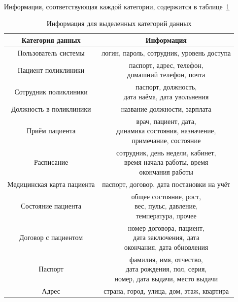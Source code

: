 Информация, соответствующая каждой категории, содержится в таблице~\ref{table:category-info}

\begin{table}[h!]
\begin{center}
	\captionsetup{justification=raggedright,singlelinecheck=off,margin=5mm}
	\caption{Информация для выделенных категорий данных}
	\begin{tabular}{| c | c |}
		\hline
		Категория данных & Информация \\
		\hline
		Пользователь системы & логин, пароль, сотрудник, уровень доступа \\
		\hline
		Пациент поликлиники & \makecell{паспорт, адрес, телефон,\\ домашний телефон, почта}  \\
		\hline
		Сотрудник поликлиники & \makecell{паспорт, должность, \\дата наёма, дата увольнения} \\
		\hline
		Должность в поликлиники & название должности, зарплата \\
		\hline
		Приём пациента & 
\makecell{врач, пациент, дата, \\
	динамика состояния, назначение,\\
	примечание, состояние}\\
		\hline
		Расписание &\makecell{сотрудник, день недели, кабинет, \\
время начала работы, время \\окончания работы}\\
		\hline
		Медицинская карта пациента & паспорт, договор, дата постановки на учёт \\
		\hline
		Состояние пациента & \makecell{общее состояние, рост,\\ вес, пульс, давление, \\температура, прочее }\\
		\hline
		Договор с пациентом & \makecell{номер договора, пациент, \\дата заключения, дата \\окончания, дата обновления} \\
		\hline
		Паспорт & \makecell{фамилия, имя, отчество, \\
дата рождения, пол, серия, \\
номер, дата выдачи, место выдачи} \\
		\hline
		Адрес & страна, город, улица, дом, этаж, квартира \\
		\hline
	\end{tabular}
	\label{table:category-info}
\end{center}
\end{table}

